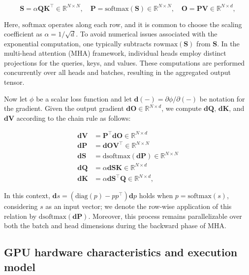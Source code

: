 \begin{enumerate}
\begin{equation*}
  \mathbf{S} = \alpha \mathbf{Q} \mathbf{K}^\top \in \mathbb{R}^{N \times N}, \quad \mathbf{P} = \mathrm{softmax}(\mathbf{S}) \in \mathbb{R}^{N \times N}, \quad \mathbf{O} = \mathbf{P}\mathbf{V} \in \mathbb{R}^{N \times d},
\end{equation*}

Here, $\mathrm{softmax}$ operates along each row, and it is common to choose the scaling coefficient as $\alpha = 1/\sqrt{d}$. To avoid numerical issues associated with the exponential computation, one typically subtracts $\mathrm{rowmax}(\mathbf{S})$ from $\mathbf{S}$. In the multi-head attention (MHA) framework, individual heads employ distinct projections for the queries, keys, and values. These computations are performed concurrently over all heads and batches, resulting in the aggregated output tensor.

Now let $\phi$ be a scalar loss function and let $\mathbf{d}(-) = \partial \phi / \partial (-)$ be notation for the gradient. Given the output gradient $\mathbf{dO} \in \mathbb{R}^{N \times d}$, we compute $\mathbf{dQ}$, $\mathbf{dK}$, and $\mathbf{dV}$ according to the chain rule as follows:

\begin{align*}
  \mathbf{dV} &= \mathbf{P}^\top \mathbf{dO} \in \mathbb{R}^{N \times d} \\
  \mathbf{dP} &= \mathbf{dO} \mathbf{V}^\top \in \mathbb{R}^{N \times N} \\
  \mathbf{dS} &= \mathrm{dsoftmax} (\mathbf{dP}) \in \mathbb{R}^{N \times N} \\
  \mathbf{dQ} &= \alpha \mathbf{dS} \mathbf{K} \in \mathbb{R}^{N \times d} \\
  \mathbf{dK} &= \alpha \mathbf{dS}^\top \mathbf{Q} \in \mathbb{R}^{N \times d},
\end{align*}

In this context, $\mathbf{d}s = (\mathrm{diag}(p) - p p^\top)\mathbf{d}p$ holds when $p = \mathrm{softmax}(s)$, considering $s$ as an input vector; we denote the row-wise application of this relation by $\mathrm{dsoftmax}(\mathbf{dP})$. Moreover, this process remains parallelizable over both the batch and head dimensions during the backward phase of MHA.

\subsection{GPU hardware characteristics and execution model}
\label{subsec:hardware}


\end{enumerate}
